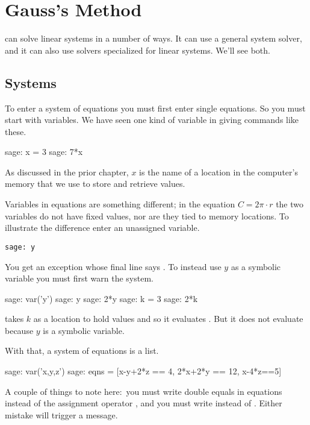 \chapter{Gauss's Method}

\Sage{} can solve linear systems in a number of ways.
It can use a general system solver, and
it can also use solvers specialized for linear systems.
We'll see both. 



\section{Systems}
To enter a system of equations you must first enter single equations.
So you must start with variables.
We have seen one kind of variable in giving commands like these.
\begin{sagecommandline}
sage: x = 3
sage: 7*x
\end{sagecommandline}
As discussed in the prior chapter,
$x$ is the name of a location in the computer's memory
that we use to store and retrieve values.

Variables in equations are something different; in the equation
$C=2\pi\cdot r$ the two variables do not have fixed values, nor
are they tied to memory locations. 
To illustrate the difference enter an unassigned 
variable.
\begin{lstlisting}
sage: y
\end{lstlisting}
You get an exception whose final line says
.
To instead use $y$ as a symbolic variable you must first
warn the system.
\begin{sagecommandline}
sage: var('y')
sage: y
sage: 2*y
sage: k = 3
sage: 2*k
\end{sagecommandline}
\Sage{} takes $k$ as a location to hold
values and so it evaluates .
But it does not evaluate  because $y$ is a symbolic variable.

With that, a system of equations is a list.
\begin{sagecommandline}
sage: var('x,y,z')                                  
sage: eqns = [x-y+2*z == 4, 2*x+2*y == 12, x-4*z==5]
\end{sagecommandline}
A couple of things to note here:~you 
must write double equals \inlinecode{==} in equations instead of 
the assignment operator \inlinecode{=}, 
and you must write 
instead of .
Either mistake will trigger a  
 message.

